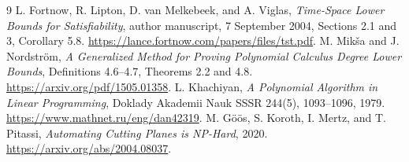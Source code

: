 \documentclass[11pt]{article}
\begin{document}
\begin{thebibliography}{9}
L. Fortnow, R. Lipton, D. van Melkebeek, and A. Viglas,
\emph{Time-Space Lower Bounds for Satisfiability}, author manuscript,
7 September 2004, Sections 2.1 and 3, Corollary 5.8.
\url{https://lance.fortnow.com/papers/files/tst.pdf}.
M. Mik\v{s}a and J. Nordstr\"om,
\emph{A Generalized Method for Proving Polynomial Calculus Degree Lower Bounds},
Definitions 4.6--4.7, Theorems 2.2 and 4.8.
\url{https://arxiv.org/pdf/1505.01358}.
L. Khachiyan, \emph{A Polynomial Algorithm in Linear Programming},
Doklady Akademii Nauk SSSR 244(5), 1093--1096, 1979.
\url{https://www.mathnet.ru/eng/dan42319}.
M. G{\"o}{\"o}s, S. Koroth, I. Mertz, and T. Pitassi,
\emph{Automating Cutting Planes is NP-Hard}, 2020.
\url{https://arxiv.org/abs/2004.08037}.
\end{thebibliography}

\end{document}
